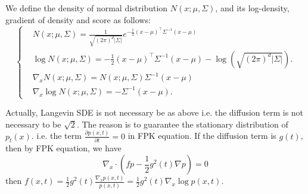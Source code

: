 \begin{remark}
    We define the density of normal distribution $N(x ; \mu, \Sigma)$, and its log-density, gradient of density and score as follows:
    \begin{equation}\left\{
        \begin{aligned}
            &N(x ; \mu, \Sigma)=\frac{1}{\sqrt{(2 \pi)^{d}|\Sigma|}} e^{-\frac{1}{2}(x-\mu)^{\top} \Sigma^{-1}(x-\mu)}\\
            &\log N(x ; \mu, \Sigma)=-\frac{1}{2}(x-\mu)^{\top} \Sigma^{-1}(x-\mu)-\log \left(\sqrt{(2 \pi)^{d}|\Sigma|}\right) . \\
            &\nabla_{x} N(x ; \mu, \Sigma)=N(x ; \mu, \Sigma)\Sigma^{-1}(x-\mu) \\
            &\nabla_{x} \log N(x ; \mu, \Sigma)=-\Sigma^{-1}(x-\mu) .
        \end{aligned}\right.
    \end{equation}
\end{remark}

Actually, Langevin SDE is not necessary be as above i.e. the diffusion term is not necessary to be $\sqrt{2}$. The reason is to guarantee the stationary distribution of $p_t(x)$.
i.e. the term $\frac{\partial p(x,t)}{\partial t}=0$ in FPK equation. If the diffusion term is $g(t)$, then by FPK equation, we have 
$$\nabla_x\cdot(fp-\frac{1}{2}g^2(t)\nabla p)=0$$
then $f(x,t) = \frac{1}{2}g^2(t)\frac{\nabla_x p(x, t)}{p(x,t)}=\frac{1}{2}g^2(t)\nabla_x\log p(x, t)$.

